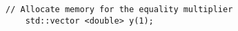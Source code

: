 \begin{lstlisting}[style=C++]
    // Allocate memory for the equality multiplier 
    std::vector <double> y(1);
\end{lstlisting}
